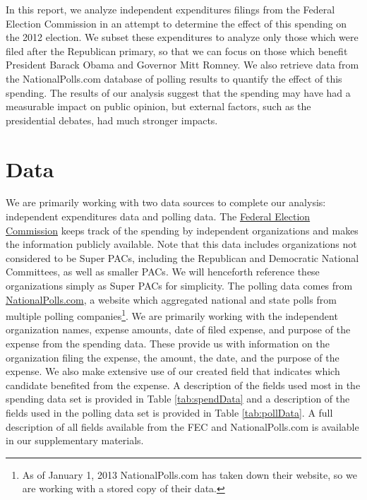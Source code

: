 \documentclass[11pt]{article}\usepackage{graphicx, color}
\begin{document}
In this report, we analyze independent expenditures filings from the Federal Election Commission in an attempt to determine the effect of this spending on the 2012 election. We subset these expenditures to analyze only those which were filed after the Republican primary, so that we can focus on those which benefit President Barack Obama and Governor Mitt Romney. We also retrieve data from the NationalPolls.com database of polling results to quantify the effect of this spending. The results of our analysis suggest that the spending may have had a measurable impact on public opinion, but external factors, such as the presidential debates, had much stronger impacts.




\section{Data}
We are primarily working with two data sources to complete our analysis: independent expenditures data and polling data. The \href{http://www.fec.gov/data/IndependentExpenditure.do?format=html&cf=superPAC}{Federal Election Commission} keeps track of the spending by independent organizations and makes the information publicly available.  Note that this data includes organizations not considered to be Super PACs, including the Republican and Democratic National Committees, as well as smaller PACs.  We will henceforth reference these organizations simply as Super PACs for simplicity. The polling data comes from \href{http://nationalpolls.com/}{NationalPolls.com}, a website which aggregated national and state polls from multiple polling companies\footnote{As of January 1, 2013 NationalPolls.com has taken down their website, so we are working with a stored copy of their data.}.  We are primarily working with the independent organization names, expense amounts, date of filed expense, and purpose of the expense from the spending data. These provide us with information on the organization filing the expense, the amount, the date, and the purpose of the expense. We also make extensive use of our created field that indicates which candidate benefited from the expense. A description of the fields used most in the spending data set is provided in Table \ref{tab:spendData} and a description of the fields used in the polling data set is provided in Table \ref{tab:pollData}. A full description of all fields available from the FEC and NationalPolls.com is available in our supplementary materials.
\end{document}
